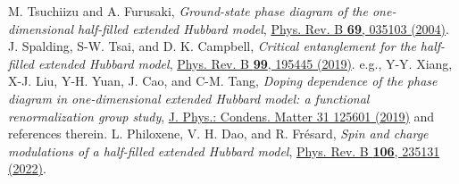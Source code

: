 \documentclass[aps,prl,showpacs,twocolumn,superscriptaddress]{revtex4-2}
\begin{document}
\begin{thebibliography}{99}
M. Tsuchiizu and A. Furusaki,
{\it Ground-state phase diagram of the one-dimensional half-filled extended Hubbard model},
\href{https://journals.aps.org/prb/abstract/10.1103/PhysRevB.69.035103}{Phys. Rev. B {\bf 69}, 035103 (2004)}.
J. Spalding, S-W. Tsai, and D. K. Campbell,
{\it  Critical entanglement for the half-filled extended Hubbard model},
\href{https://journals.aps.org/prb/abstract/10.1103/PhysRevB.99.195445}{  Phys. Rev. B {\bf 99}, 195445 (2019)}.
e.g., Y-Y. Xiang, X-J. Liu, Y-H. Yuan, J. Cao, and C-M. Tang,
{\it Doping dependence of the phase diagram in one-dimensional extended Hubbard model: a functional renormalization group study}, \href{https://iopscience.iop.org/article/10.1088/1361-648X/aafd4d/meta}{J. Phys.: Condens. Matter 31 125601 (2019)} and references therein.
L. Philoxene, V. H. Dao, and R. Fr\'esard,
{\it Spin and charge modulations of a half-filled extended Hubbard model},
\href{https://journals.aps.org/prb/abstract/10.1103/PhysRevB.106.235131}{Phys. Rev. B {\bf 106}, 235131 (2022)}.






\end{thebibliography}
\end{document}
